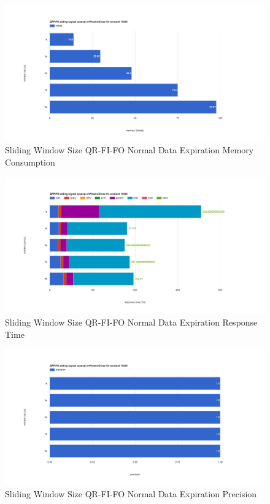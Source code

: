 \begin{figure}[!htbp]
    \centering
    \includegraphics[width=\textwidth]{img/app3-slide-ws-qrfifo-normal-m.png}
    \caption{Sliding Window Size QR-FI-FO Normal Data Expiration Memory Consumption}
\end{figure}
\begin{figure}[!htbp]
    \centering
    \includegraphics[width=\textwidth]{img/app3-slide-ws-qrfifo-normal-r.png}
    \caption{Sliding Window Size QR-FI-FO Normal Data Expiration Response Time}
\end{figure}
\begin{figure}[!htbp]
    \centering
    \includegraphics[width=\textwidth]{img/app3-slide-ws-qrfifo-normal-p.png}
    \caption{Sliding Window Size QR-FI-FO Normal Data Expiration Precision}
\end{figure}

